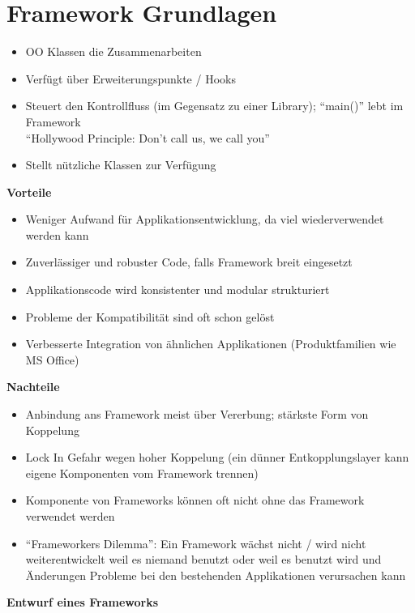 \section{Framework Grundlagen}

\begin{itemize}
	\item OO Klassen die Zusammenarbeiten
	\item Verfügt über Erweiterungspunkte / Hooks
	\item Steuert den Kontrollfluss (im Gegensatz zu einer Library); ``main()'' lebt im Framework \\
		``Hollywood Principle: Don't call us, we call you''
	\item Stellt nützliche Klassen zur Verfügung
\end{itemize}

\textbf{Vorteile}

\begin{itemize}
	\item Weniger Aufwand für Applikationsentwicklung, da viel wiederverwendet werden kann
	\item Zuverlässiger und robuster Code, falls Framework breit eingesetzt
	\item Applikationscode wird konsistenter und modular strukturiert
	\item Probleme der Kompatibilität sind oft schon gelöst
	\item Verbesserte Integration von ähnlichen Applikationen (Produktfamilien wie MS Office)
\end{itemize}

\textbf{Nachteile}

\begin{itemize}
	\item Anbindung ans Framework meist über Vererbung; stärkste Form von Koppelung
	\item Lock In Gefahr wegen hoher Koppelung (ein dünner Entkopplungslayer kann eigene Komponenten vom Framework trennen)
	\item Komponente von Frameworks können oft nicht ohne das Framework verwendet werden
	\item ``Frameworkers Dilemma'': Ein Framework wächst nicht / wird nicht weiterentwickelt weil es niemand benutzt oder weil es benutzt wird und Änderungen Probleme bei den bestehenden Applikationen verursachen kann
\end{itemize}

\textbf{Entwurf eines Frameworks}

